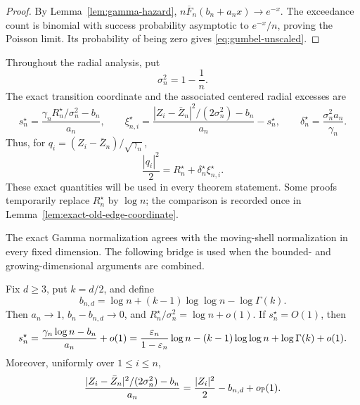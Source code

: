 \begin{proof}
By Lemma~\ref{lem:gamma-hazard},
\(n\overline F_n(b_n+a_nx)\to e^{-x}\). The exceedance count is binomial
with success probability asymptotic to \(e^{-x}/n\), proving the Poisson
limit. Its probability of being zero gives \eqref{eq:gumbel-unscaled}.
\end{proof}

Throughout the radial analysis, put
\begin{equation}
\label{eq:residual-variance}
 \sigma_n^2=1-\frac1n.
\end{equation}
The exact transition coordinate and the associated centered radial excesses
are
\begin{equation}
\label{eq:exact-transition-coordinate}
 s_n^\star
 =\frac{\gamma_nR_n^\star/\sigma_n^2-b_n}{a_n},
 \qquad
 \xi_{n,i}^\star
 =\frac{|Z_i-\bar Z_n|^2/(2\sigma_n^2)-b_n}{a_n}-s_n^\star,
 \qquad
 \delta_n^\star=\frac{\sigma_n^2a_n}{\gamma_n}.
\end{equation}
Thus, for \(q_i=(Z_i-\bar Z_n)/\sqrt{\gamma_n}\),
\begin{equation}
\label{eq:exact-support-radius}
 \frac{|q_i|^2}{2}=R_n^\star+\delta_n^\star\xi_{n,i}^\star.
\end{equation}
These exact quantities will be used in every theorem statement. Some proofs
temporarily replace \(R_n^\star\) by \(\log n\); the comparison is recorded
once in Lemma~\ref{lem:exact-old-edge-coordinate}.

The exact Gamma normalization agrees with the moving-shell normalization in
every fixed dimension. The following bridge is used when the bounded- and
growing-dimensional arguments are combined.
\begin{lemma}
\label{lem:fixed-d-normalization-bridge}
Fix \(d\ge3\), put \(k=d/2\), and define
\[
 b_{n,d}=\log n+(k-1)\log\log n-\log\Gamma(k).
\]
Then \(a_n\to1\), \(b_n-b_{n,d}\to0\), and
\(R_n^\star/\sigma_n^2=\log n+o(1)\). If \(s_n^\star=O(1)\), then
\begin{equation}
\label{eq:fixed-d-coordinate-bridge}
 s_n^\star
 =\frac{\gamma_n\log n-b_n}{a_n}+o(1)
 =\frac{\varepsilon_n}{1-\varepsilon_n}\log n
   -(k-1)\log\log n+\log\Gamma(k)+o(1).
\end{equation}
Moreover, uniformly over \(1\le i\le n\),
\begin{equation}
\label{eq:fixed-d-excess-bridge}
 \frac{|Z_i-\bar Z_n|^2/(2\sigma_n^2)-b_n}{a_n}
 =\frac{|Z_i|^2}{2}-b_{n,d}+o_{\mathbb P}(1).
\end{equation}
\end{lemma}

